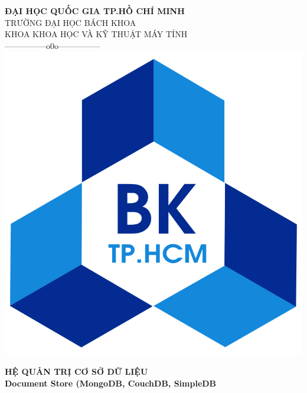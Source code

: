 \documentclass[12pt]{report}
\begin{document}
\begin{titlepage}
\begin{center}
	\textbf{ĐẠI HỌC QUỐC GIA TP.HỒ CHÍ MINH}\\
	TRƯỜNG ĐẠI HỌC BÁCH KHOA\\
	KHOA KHOA HỌC VÀ KỸ THUẬT MÁY TÍNH\\
	---------------o0o--------------- \\
	\vspace{5mm}
	\includegraphics[scale=0.2]{charts/logo.png}
\end{center}
\vspace{5mm}

\begin{center}
	\textbf{\small HỆ QUẢN TRỊ CƠ SỞ DỮ LIỆU}\\
	\textbf{\large Document Store (MongoDB, CouchDB, SimpleDB} 
\end{center}




\end{titlepage}
\end{document}
